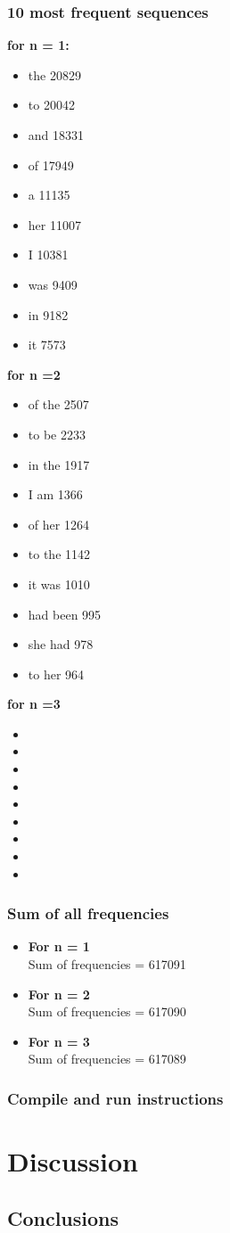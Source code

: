 \documentclass[final,12pt]{elsarticle}
\begin{document}
\subsubsection{10 most frequent sequences}
\textbf{for n = 1:}
\begin{itemize}
\item the 20829
\item to 20042
\item and 18331 
\item of 17949
\item a 11135
\item her 11007
\item I 10381
\item was 9409
\item in 9182 
\item it 7573
\end{itemize}
\textbf{for n =2}
\begin{itemize}
\item of the 2507
\item to be 2233
\item in the 1917
\item I am 1366
\item of her 1264
\item to the 1142
\item it was 1010
\item had been 995
\item she had 978
\item to her 964
\end{itemize}
\textbf{for n =3}
\begin{itemize}
\item 
\item
\item
\item
\item
\item
\item
\item
\item
\end{itemize}
\subsubsection{Sum of all frequencies}
\begin{itemize}
\item \textbf{For n = 1}\\
Sum of frequencies = 617091
\item \textbf{For n = 2}\\
Sum of frequencies = 617090
\item \textbf{For n = 3}\\
Sum of frequencies = 617089
\end{itemize}
\subsubsection{Compile and run instructions}
\section{Discussion}
\subsection{Conclusions}
\end{document}

